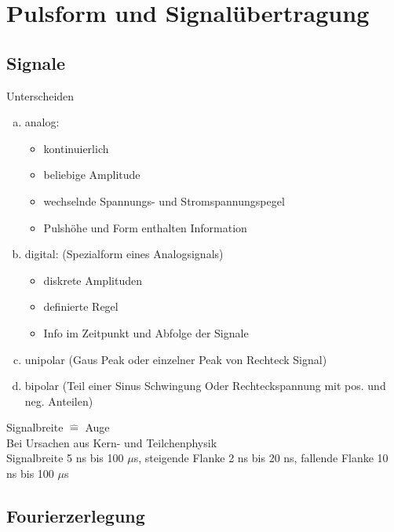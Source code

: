 \setcounter{chapter}{9}

\chapter{Pulsform und Signalübertragung}

\section{Signale}

Unterscheiden
\begin{enumerate}[a)]
	\item analog:
	\begin{itemize}
		\item kontinuierlich
		\item beliebige Amplitude
		\item wechselnde Spannungs- und Stromspannungspegel
		\item Pulshöhe und Form enthalten Information
	\end{itemize}
	\item digital: (Spezialform eines Analogsignals)
	\begin{itemize}
		\item diskrete Amplituden
		\item definierte Regel
		\item Info im Zeitpunkt und Abfolge der Signale
	\end{itemize}
	\item unipolar (Gaus Peak oder einzelner Peak von Rechteck Signal)
	\item bipolar (Teil einer Sinus Schwingung Oder Rechteckspannung mit pos. und neg. Anteilen)
\end{enumerate}

\hft

\noindent
Signalbreite $ \widehat{=} $ Auge\\
Bei Ursachen aus Kern- und Teilchenphysik\\
Signalbreite 5 ns bis 100 $ \mu $s, steigende Flanke 2 ns bis 20 ns, fallende Flanke 10 ns bis 100 $ \mu $s

\section{Fourierzerlegung}

